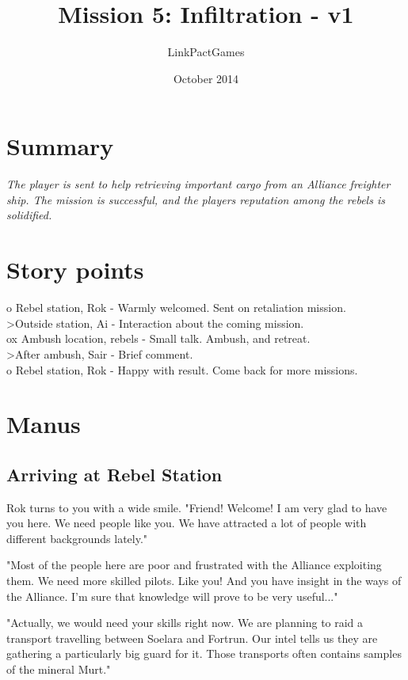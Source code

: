 \documentclass[a4paper,12pt]{article}
\begin{document}
\title{Mission 5: Infiltration - v1}
\author{LinkPactGames}
\date{October 2014}
\maketitle

\section{Summary}

\textit{The player is sent to help retrieving important cargo from an
Alliance freighter ship. The mission is successful, and the
players reputation among the rebels is solidified.}

\section{Story points}

o Rebel station, Rok - Warmly welcomed. Sent on retaliation mission.\\
\textgreater Outside station, Ai - Interaction about the coming mission.\\
ox Ambush location, rebels - Small talk. Ambush, and retreat.\\
\textgreater After ambush, Sair - Brief comment.\\
o Rebel station, Rok - Happy with result. Come back for more missions.\\

\section{Manus}

\subsection{Arriving at Rebel Station}

Rok turns to you with a wide smile. "Friend! Welcome! I am very glad to
have you here. We need people like you. We have attracted a lot of people
with different backgrounds lately." 

"Most of the people here are poor and frustrated with the
Alliance exploiting them. We need more
skilled pilots. Like you! And you have insight in the ways of the Alliance.
I'm sure that knowledge will prove to be very useful..."

"Actually, we would need your skills right now. We are planning to raid a
transport travelling between Soelara and Fortrun. Our intel tells us they are
gathering a particularly big guard for it. Those transports often contains
samples of the mineral Murt."
\end{document}
